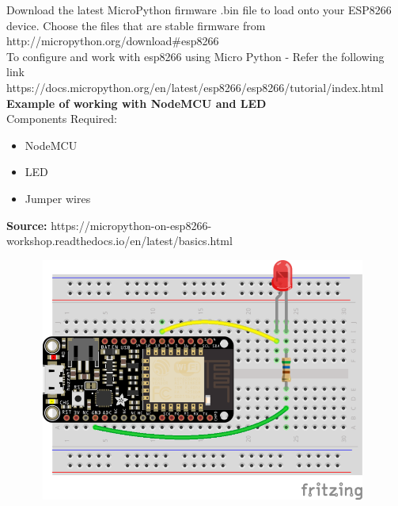 \documentclass[12pt,a4paper]{article}
\begin{document}
Download the latest MicroPython firmware .bin file to load onto your ESP8266 device. Choose the files that are stable firmware from http://micropython.org/download#esp8266
\\
To configure and work with esp8266 using Micro Python -
Refer the following link \\
https://docs.micropython.org/en/latest/esp8266/esp8266/tutorial/index.html \\
\clearpage
\textbf{Example of working with NodeMCU and LED}
\\
Components Required:
\begin{itemize}
    \item NodeMCU
    \item LED
    \item Jumper wires
\end{itemize} 
\textbf{Source:} https://micropython-on-esp8266-workshop.readthedocs.io/en/latest/basics.html
\begin{figure}[h!]
    \centering
	\includegraphics[width=11cm, height=8cm]{Introduction/18.png}
\end{figure}
\\
\end{document}
